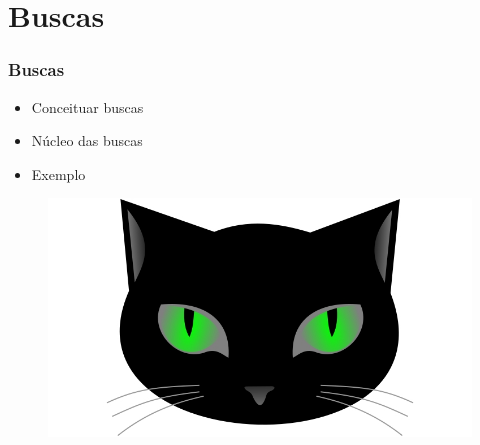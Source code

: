 
\section{Buscas}


\begin{frame}
\frametitle{Buscas}
\begin{minipage}{0.47\textwidth}
    \begin{itemize}
        \item Conceituar buscas
        \item Núcleo das buscas
        \item Exemplo
    \end{itemize}
\end{minipage}
\begin{minipage}{0.5\textwidth}
\begin{figure}[ht!]
\begin{center}
\includegraphics[width=1.2\textwidth, height=0.40\textheight]{figures/logo_picat_alex.jpg}
\end{center}
\end{figure}
\end{minipage}
\end{frame}




